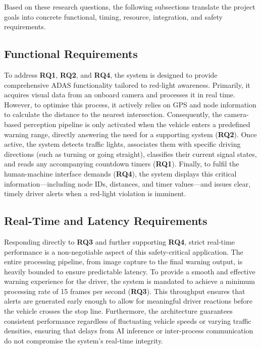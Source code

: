 Based on these research questions, the following subsections translate the project goals into concrete functional, timing, resource, integration, and safety requirements.

\subsection{Functional Requirements}

To address \textbf{RQ1}, \textbf{RQ2}, and \textbf{RQ4}, the system is designed to provide comprehensive ADAS functionality tailored to red-light awareness. Primarily, it acquires visual data from an onboard camera and processes it in real time. However, to optimise this process, it actively relies on GPS and node information to calculate the distance to the nearest intersection. Consequently, the camera-based perception pipeline is only activated when the vehicle enters a predefined warning range, directly answering the need for a supporting system (\textbf{RQ2}). Once active, the system detects traffic lights, associates them with specific driving directions (such as turning or going straight), classifies their current signal states, and reads any accompanying countdown timers (\textbf{RQ1}). Finally, to fulfil the human-machine interface demands (\textbf{RQ4}), the system displays this critical information---including node IDs, distances, and timer values---and issues clear, timely driver alerts when a red-light violation is imminent.

\subsection{Real-Time and Latency Requirements}

Responding directly to \textbf{RQ3} and further supporting \textbf{RQ4}, strict real-time performance is a non-negotiable aspect of this safety-critical application. The entire processing pipeline, from image capture to the final warning output, is heavily bounded to ensure predictable latency. To provide a smooth and effective warning experience for the driver, the system is mandated to achieve a minimum processing rate of 15 frames per second (\textbf{RQ3}). This throughput ensures that alerts are generated early enough to allow for meaningful driver reactions before the vehicle crosses the stop line. Furthermore, the architecture guarantees consistent performance regardless of fluctuating vehicle speeds or varying traffic densities, ensuring that delays from AI inference or inter-process communication do not compromise the system's real-time integrity.

